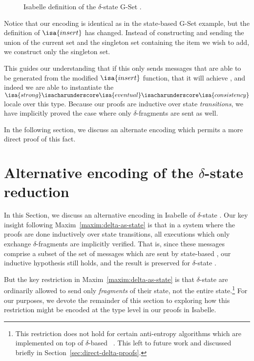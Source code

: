 \begin{figure}[H]
  
  \caption{Isabelle definition of the $\delta$-state G-Set \CRDT.}
\end{figure}

Notice that our encoding is identical as in the state-based G-Set example, but
the definition of $\isa{insert}$ has changed. Instead of constructing and
sending the union of the current set and the singleton set containing the item
we wish to add, we construct only the singleton set.

This guides our understanding that if this \CRDT only sends messages that are
able to be generated from the modified $\isa{insert}$ function, that it will
achieve \SEC, and indeed we are able to instantiate the
$\isa{strong}\isacharunderscore\isa{eventual}\isacharunderscore\isa{consistency}$
locale over this type. Because our proofs are inductive over state
\emph{transitions}, we have implicitly proved the case where only
$\delta$-fragments are sent as well.

In the following section, we discuss an alternate encoding which permits a more
direct proof of this fact.

\section{Alternative encoding of the $\delta$-state reduction}
\label{sec:alternate-delta-encoding}

In this Section, we discuss an alternative encoding in Isabelle of
$\delta$-state \CRDTs. Our key insight following
Maxim~\ref{maxim:delta-as-state} is that in a system where the proofs are done
inductively over state transitions, all executions which only exchange
$\delta$-fragments are implicitly verified. That is, since these messages
comprise a subset of the set of messages which are sent by state-based \CRDTs,
our inductive hypothesis still holds, and the result is preserved for
$\delta$-state \CRDTs.

But the key restriction in Maxim~\ref{maxim:delta-as-state} is that
$\delta$-state \CRDTs are ordinarily allowed to send only \emph{fragments} of
their state, not the entire state.\footnote{This restriction does not hold for
certain anti-entropy algorithms which are implemented on top of $\delta$-based
\CRDTs~\citep{almedia18}. This left to future work and discussed briefly in
Section~\ref{sec:direct-delta-proofs}.} For our purposes, we devote the
remainder of this section to exploring how this restriction might be encoded at
the type level in our proofs in Isabelle.

